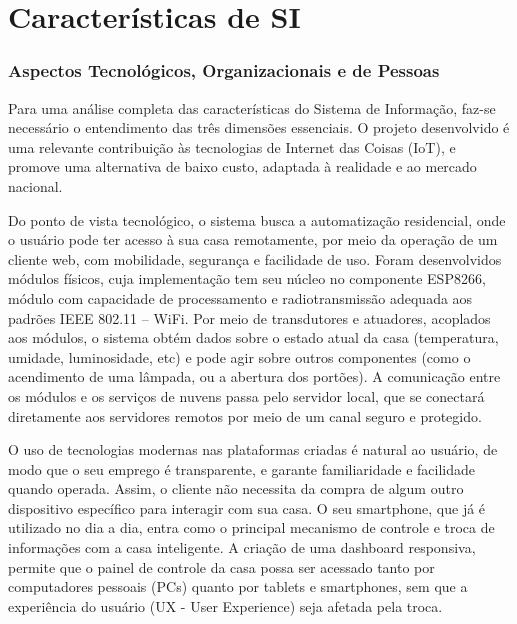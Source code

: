 \chapter{Características de SI}

\subsection{Aspectos Tecnológicos, Organizacionais e de Pessoas}

Para uma análise completa das características do Sistema de Informação, faz-se necessário o entendimento das três dimensões essenciais. O projeto desenvolvido é uma relevante contribuição às tecnologias de Internet das Coisas (IoT), e promove uma alternativa de baixo custo, adaptada à realidade e ao mercado nacional.

Do ponto de vista tecnológico, o sistema busca a automatização residencial, onde o usuário pode ter acesso à sua casa remotamente, por meio da operação de um cliente web, com mobilidade, segurança e facilidade de uso. Foram desenvolvidos módulos físicos, cuja implementação tem seu núcleo no componente ESP8266, módulo com capacidade de processamento e radiotransmissão adequada aos padrões IEEE 802.11 -- WiFi. Por meio de transdutores e atuadores, acoplados aos módulos, o sistema obtém dados sobre o estado atual da casa (temperatura, umidade, luminosidade, etc) e pode agir sobre outros componentes (como o acendimento de uma lâmpada, ou a abertura dos portões). A comunicação entre os módulos e os serviços de nuvens passa pelo servidor local, que se conectará diretamente aos servidores remotos por meio de um canal seguro e protegido.

O uso de tecnologias modernas nas plataformas criadas é natural ao usuário, de modo que o seu emprego é transparente, e garante familiaridade e facilidade quando operada. Assim, o cliente não necessita da compra de algum outro dispositivo específico para interagir com sua casa. O seu smartphone, que já é utilizado no dia a dia, entra como o principal mecanismo de controle e troca de informações com a casa inteligente. A criação de uma dashboard responsiva, permite que o painel de controle da casa possa ser acessado tanto por computadores pessoais (PCs) quanto por tablets e smartphones, sem que a experiência do usuário (UX - User Experience) seja afetada pela troca.

